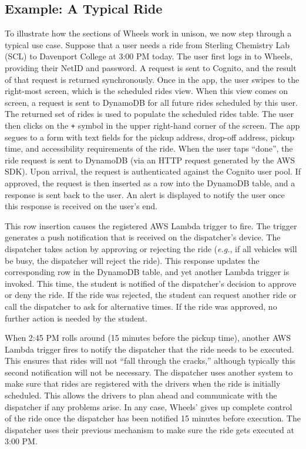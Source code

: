 \documentclass[12pt, a4paper]{article}
\begin{document}
\begin{multicols*}{2}
\subsection{Example: A Typical Ride}
To illustrate how the sections of Wheels work in unison, we now step through a typical use case. Suppose that a user needs a ride from Sterling Chemistry Lab (SCL) to Davenport College at 3:00 PM today. The user first logs in to Wheels, providing their NetID and password. A request is sent to Cognito, and the result of that request is returned synchronously. Once in the app, the user swipes to the right-most screen, which is the scheduled rides view. When this view comes on screen, a request is sent to DynamoDB for all future rides scheduled by this user. The returned set of rides is used to populate the scheduled rides table. The user then clicks on the \texttt{+} symbol in the upper right-hand corner of the screen. The app segues to a form with text fields for the pickup address, drop-off address, pickup time, and accessibility requirements of the ride. When the user taps ``done'', the ride request is sent to DynamoDB (via an HTTP request generated by the AWS SDK). Upon arrival, the request is authenticated against the Cognito user pool. If approved, the request is then inserted as a row into the DynamoDB table, and a response is sent back to the user. An alert is displayed to notify the user once this response is received on the user's end.

This row insertion causes the registered AWS Lambda trigger to fire. The trigger generates a push notification that is received on the dispatcher's device. The dispatcher takes action by approving or rejecting the ride (\textit{e.g.}, if all vehicles will be busy, the dispatcher will reject the ride). This response updates the corresponding row in the DynamoDB table, and yet another Lambda trigger is invoked. This time, the student is notified of the dispatcher's decision to approve or deny the ride. If the ride was rejected, the student can request another ride or call the dispatcher to ask for alternative times. If the ride was approved, no further action is needed by the student.

When 2:45 PM rolls around (15 minutes before the pickup time), another AWS Lambda trigger fires to notify the dispatcher that the ride needs to be executed. This ensures that rides will not ``fall through the cracks,'' although typically this second notification will not be necessary. The dispatcher uses another system to make sure that rides are registered with the drivers when the ride is initially scheduled. This allows the drivers to plan ahead and communicate with the dispatcher if any problems arise. In any case, Wheels' gives up complete control of the ride once the dispatcher has been notified 15 minutes before execution. The dispatcher uses their previous mechanism to make sure the ride gets executed at 3:00 PM.


\end{multicols*}
\end{document}

